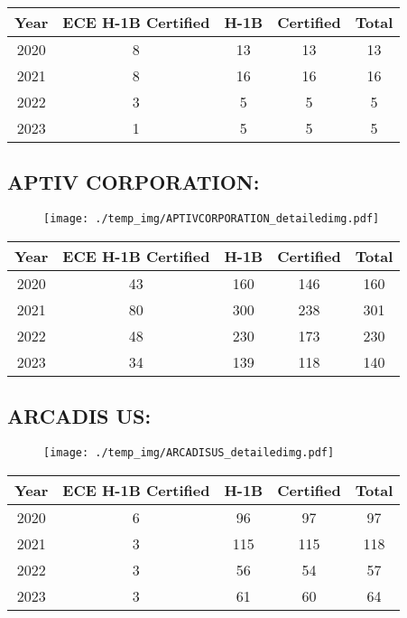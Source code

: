 \documentclass{article}%
\begin{document}
%
\begin{longtable}{c|c|c|c|c}%
\hline%
Year&ECE H{-}1B Certified&H{-}1B&Certified&Total\\%
\hline%
2020&8&13&13&13\\%
\hline%
2021&8&16&16&16\\%
\hline%
2022&3&5&5&5\\%
\hline%
2023&1&5&5&5\\%
\hline%
\end{longtable}

%
\newpage%
\subsection{APTIV CORPORATION:}%
\label{subsec:APTIVCORPORATION}%
\label{APTIVCORPORATIONdetailed}%


\begin{figure}[htbp]%
\centering%
\texttt{[image: ./temp\_img/APTIVCORPORATION\_detailedimg.pdf]}%
\end{figure}

%
\begin{longtable}{c|c|c|c|c}%
\hline%
Year&ECE H{-}1B Certified&H{-}1B&Certified&Total\\%
\hline%
2020&43&160&146&160\\%
\hline%
2021&80&300&238&301\\%
\hline%
2022&48&230&173&230\\%
\hline%
2023&34&139&118&140\\%
\hline%
\end{longtable}

%
\newpage%
\subsection{ARCADIS US:}%
\label{subsec:ARCADISUS}%
\label{ARCADISUSdetailed}%


\begin{figure}[htbp]%
\centering%
\texttt{[image: ./temp\_img/ARCADISUS\_detailedimg.pdf]}%
\end{figure}

%
\begin{longtable}{c|c|c|c|c}%
\hline%
Year&ECE H{-}1B Certified&H{-}1B&Certified&Total\\%
\hline%
2020&6&96&97&97\\%
\hline%
2021&3&115&115&118\\%
\hline%
2022&3&56&54&57\\%
\hline%
2023&3&61&60&64\\%
\hline%
\end{longtable}
\end{document}
